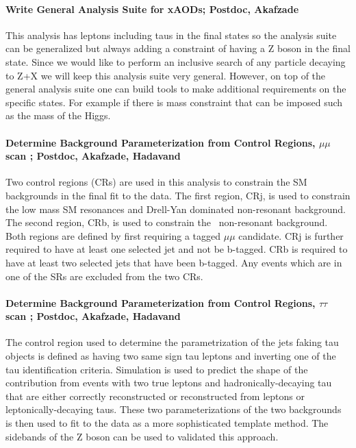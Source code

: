 \documentclass[11pt]{article}
\newcommand{\too}{$\rightarrow$}
\begin{document}
\paragraph{Write General Analysis Suite for xAODs;  Postdoc, Akafzade} %
This analysis has leptons including taus in the final states so the analysis suite can be generalized but always adding a constraint of having a Z boson in the final state. 
Since we would like to perform an inclusive search of any particle decaying to Z+X we will keep this analysis suite very general. 
However, on top of the general analysis suite one can build tools to make additional requirements on the specific states. For example if there is mass constraint that can be imposed such as the mass of the Higgs.

\paragraph{Determine Background Parameterization from Control Regions, $\mu\mu$ scan ;  Postdoc, Akafzade, Hadavand}
Two control regions (CRs) are used in this analysis to constrain the SM backgrounds in the final fit to the data. The first region, CRj, is used to constrain the 
low mass SM resonances and Drell-Yan dominated non-resonant background. The second region, CRb, is used to constrain the \ttbar\ non-resonant background.
Both regions are defined by first requiring a tagged $\mu\mu$ candidate. CRj is further required to have
at least one selected jet and not be b-tagged. CRb is required to have at least two selected jets that have been b-tagged.
Any events which are in one of the SRs are excluded from the two CRs.

\paragraph{Determine Background Parameterization from Control Regions, $\tau\tau$ scan ;  Postdoc, Akafzade, Hadavand}
The control region used to determine the parametrization of the jets faking tau objects is defined as having two same sign tau leptons and inverting one of the tau identification criteria.
Simulation is used to predict the shape of the contribution from events with two true leptons and hadronically-decaying tau that are either correctly reconstructed or reconstructed
from leptons or leptonically-decaying taus.  These two parameterizations of the two backgrounds is then used to fit to the data as a more sophisticated template method.  The sidebands of the Z boson
can be used to validated this approach.
\end{document}
